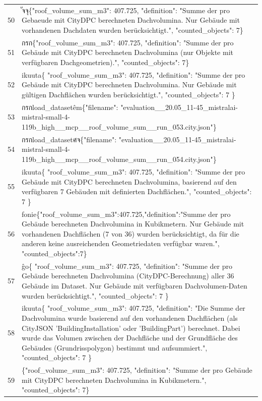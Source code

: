 \documentclass[a4paper,11pt]{article}
\begin{document}
\begin{table}[ht]
\begin{tabular}{r p{12cm}}
50 & ัจจุ\{"roof\_volume\_sum\_m3": 407.725, "definition": "Summe der pro Gebaeude mit CityDPC berechneten Dachvolumina. Nur Gebäude mit vorhandenen Dachdaten wurden berücksichtigt.", "counted\_objects": 7\} \\
51 &  กรก\{"roof\_volume\_sum\_m3": 407.725, "definition": "Summe der pro Gebäude mit CityDPC berechneten Dachvolumina (nur Objekte mit verfügbaren Dachgeometrien).", "counted\_objects": 7\} \\
52 & ikuuta\{
  "roof\_volume\_sum\_m3": 407.725,
  "definition": "Summe der pro Gebäude mit CityDPC berechneten Dachvolumina. Nur Gebäude mit gültigen Dachflächen wurden berücksichtigt.",
  "counted\_objects": 7
\} \\
53 &  กรกload\_datasetêm\{"filename": "evaluation\_\_20.05\_11-45\_mistralai-mistral-small-4-119b\_high\_\_mcp\_\_roof\_volume\_sum\_\_run\_053.city.json"\} \\
54 &  กรกload\_datasetศจ\{"filename": "evaluation\_\_20.05\_11-45\_mistralai-mistral-small-4-119b\_high\_\_mcp\_\_roof\_volume\_sum\_\_run\_054.city.json"\} \\
55 & ikuuta\{
  "roof\_volume\_sum\_m3": 407.725,
  "definition": "Summe der pro Gebäude mit CityDPC berechneten Dachvolumina, basierend auf den verfügbaren 7 Gebäuden mit definierten Dachflächen.",
  "counted\_objects": 7
\} \\
56 & fonie\{"roof\_volume\_sum\_m3":407.725,"definition":"Summe der pro Gebäude berechneten Dachvolumina in Kubikmetern. Nur Gebäude mit vorhandenen Dachflächen (7 von 36) wurden berücksichtigt, da für die anderen keine ausreichenden Geometriedaten verfügbar waren.", "counted\_objects":7\} \\
57 & ĝo\{
  "roof\_volume\_sum\_m3": 407.725,
  "definition": "Summe der pro Gebäude berechneten Dachvolumina (CityDPC-Berechnung) aller 36 Gebäude im Dataset. Nur Gebäude mit verfügbaren Dachvolumen-Daten wurden berücksichtigt.",
  "counted\_objects": 7
\} \\
58 & ikuuta\{
  "roof\_volume\_sum\_m3": 407.725,
  "definition": "Die Summe der Dachvolumina wurde basierend auf den vorhandenen Dachflächen (als CityJSON 'BuildingInstallation' oder 'BuildingPart') berechnet. Dabei wurde das Volumen zwischen der Dachfläche und der Grundfläche des Gebäudes (Grundrisspolygon) bestimmt und aufsummiert.",
  "counted\_objects": 7
\} \\
59 & \{"roof\_volume\_sum\_m3": 407.725, "definition": "Summe der pro Gebäude mit CityDPC berechneten Dachvolumina in Kubikmetern.", "counted\_objects": 7\} \\

\end{tabular}
\end{table}
\end{document}
